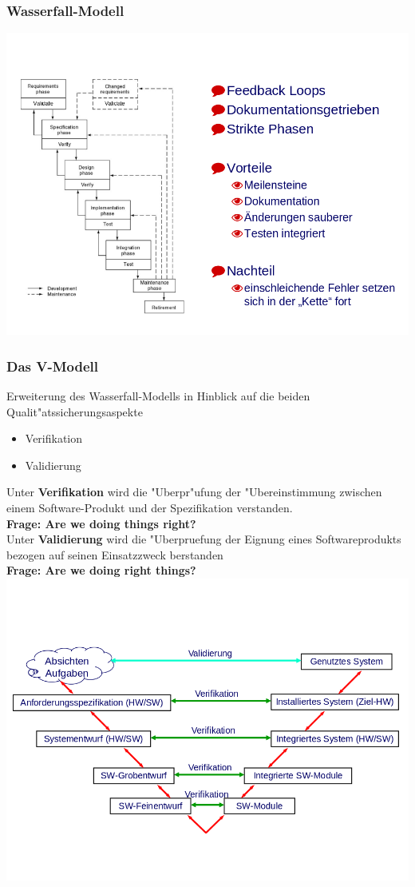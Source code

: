 \subsubsection{Wasserfall-Modell}
\includegraphics[scale=0.5]{./inc/Einfuehrung/wasserfall.png}

\subsubsection{Das V-Modell}

Erweiterung des Wasserfall-Modells in Hinblick auf die beiden Qualit"atssicherungsaspekte 
\begin{itemize}
    \item Verifikation
    \item Validierung
\end{itemize}

Unter \textbf{Verifikation} wird die "Uberpr"ufung der "Ubereinstimmung zwischen einem Software-Produkt und der Spezifikation verstanden.\\
\textbf{Frage: Are we doing things right?}\\

Unter \textbf{Validierung} wird die "Uberpruefung der Eignung eines Softwareprodukts bezogen auf seinen Einsatzzweck berstanden\\
\textbf{Frage: Are we doing right things?}\\


\includegraphics[scale=0.5]{./inc/Einfuehrung/v-modell.png}


